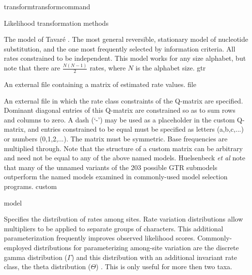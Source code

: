 \begin{command}{transform}{transformcommand}
\begin{arguments}
\begin{argumentgroup}{Likelihood transformation methods}
{\begin{description}
                        {The model of Tavar\'{e} \cite{tavare1986}. The most general
                        reversible, stationary model of nucleotide substitution,
                        and the one most frequently selected by information
                        criteria. All rates constrained to be independent. This
                        model works for any size alphabet, but note that there
                        are $\frac{N (N-1)}{2}$ rates, where $N$ is the alphabet
                        size.}
                        {gtr}

                        {An external file containing a matrix of estimated rate
                        values.}
                        {file}

                        {An external file in which the rate class constraints of
                        the Q-matrix are specified. Dominant diagonal entries of
                        this Q-matrix are constrained so as to sum rows and
                        columns to zero.  A dash (`-') may be used as a
                        placeholder in the custom Q-matrix, and entries
                        constrained to be equal must be specified as letters
                        (a,b,c,...) or numbers (0,1,2,...). The matrix must be
                        symmetric. Base frequencies are multiplied through. Note
                        that the structure of a custom matrix can be arbitrary
                        and need not be equal to any of the above named models.
                        Huelsenbeck \emph{et al} \cite{huelsenbeck2004bayesian} note that many of the
                        unnamed variants of the 203 possible GTR submodels
                        outperform the named models examined in commonly-used
                        model selection programs.}
                        {custom}

                \end{description}}
            {model}

                {Specifies the distribution of rates among sites. Rate
                variation distributions allow multipliers to be applied to
                separate groups of characters. This additional parameterization
                frequently improves observed likelihood scores.
                Commonly-employed distributions for parameterizing among-site
                variation are the discrete gamma distribution ($\Gamma$)
                \cite{yang1994a} and this distribution with an additional
                invariant rate class, the theta distribution ($\Theta$)
                \cite{gu1995}. This is only useful for more then two taxa.
                
}
\end{argumentgroup}
\end{arguments}
\end{command}
